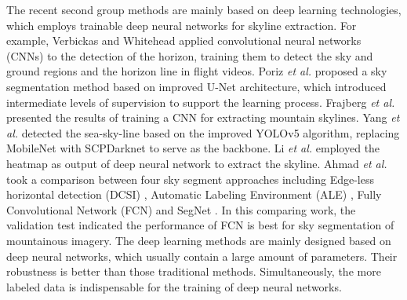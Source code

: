\par The recent second group methods are mainly based on deep learning technologies, which employs trainable deep neural networks for skyline extraction. For example, Verbickas and Whitehead \cite{Verbickas2014} applied convolutional neural networks (CNNs) to the detection of the horizon, training them to detect the sky and ground regions and the horizon line in flight videos. Poriz \textit{et al.} \cite{Porzi2016} proposed a sky segmentation method based on improved U-Net architecture\cite{Ronneberger2015}, which introduced intermediate levels of supervision to support the learning process. Frajberg \textit{et al.} \cite{Frajberg2017}  presented the results of training a CNN for extracting mountain skylines. Yang \textit{et al.} \cite{Yang2021} detected the sea-sky-line based on the improved YOLOv5 algorithm, replacing MobileNet\cite{2020MobileNets} with SCPDarknet \cite{Bochkovskiy2020} to serve as the backbone. Li \textit{et al.} \cite{Li2024} employed the heatmap as output of deep neural network to extract the skyline. Ahmad \textit{et al.} \cite{Ahmad2017} took a comparison between four sky segment approaches including Edge-less horizontal detection (DCSI) \cite{Ahmad2015Edgeless}, Automatic Labeling Environment (ALE) \cite{Saurer2016}, Fully Convolutional Network (FCN) \cite{Long_2015_CVPR} and SegNet \cite{Badrinarayanan2017}. In this comparing work, the validation test indicated the performance of FCN is best for sky segmentation of mountainous imagery. The deep learning methods are mainly designed based on deep neural networks, which usually contain a large amount of parameters. Their robustness is better than those traditional methods. Simultaneously, the more labeled data is indispensable for the training of deep neural networks.